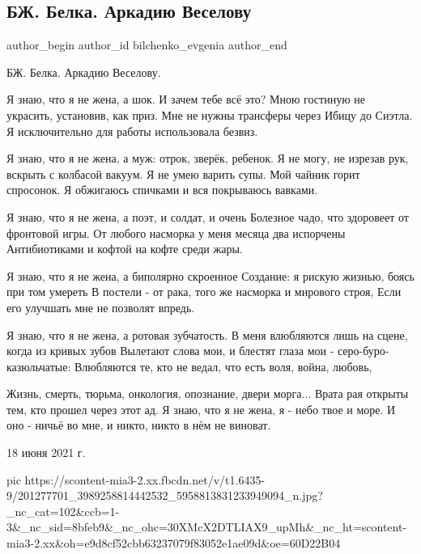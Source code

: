  
 
 
 
 
 
\subsection{БЖ. Белка. Аркадию Веселову}
\label{sec:18_06_2021.fb.bilchenko_evgenia.1.belka_arkadiju_veselovu}
\ifcmt
 author_begin
   author_id bilchenko_evgenia
 author_end
\fi

БЖ. Белка.
Аркадию Веселову.

Я знаю, что я не жена, а шок. И зачем тебе всё это?
Мною гостиную не украсить, установив, как приз.
Мне не нужны трансферы через Ибицу до Сиэтла.
Я исключительно для работы использовала безвиз.

Я знаю, что я не жена, а муж: отрок, зверёк, ребенок.
Я не могу, не изрезав рук, вскрыть с колбасой вакуум.
Я не умею варить супы. Мой чайник горит спросонок.
Я обжигаюсь спичками и вся покрываюсь вавками.

Я знаю, что я не жена, а поэт, и солдат, и очень
Болезное чадо, что здоровеет от фронтовой игры.
От любого насморка у меня месяца два испорчены
Антибиотиками и кофтой на кофте среди жары.

Я знаю, что я не жена, а биполярно скроенное
Создание: я рискую жизнью, боясь при том умереть
В постели - от рака, того же насморка и мирового строя,
Если его улучшать мне не позволят впредь.

Я знаю, что я не жена, а ротовая зубчатость.
В меня влюбляются лишь на сцене, когда из кривых зубов
Вылетают слова мои, и блестят глаза мои - серо-буро-казюльчатые:
Влюбляются те, кто не ведал, что есть воля, война, любовь,

Жизнь, смерть, тюрьма, онкология, опознание, двери  морга...
Врата рая открыты тем, кто прошел через этот ад.
Я знаю, что я не жена, я - небо твое и море.
И оно - ничьё во мне, и никто, никто в нём не виноват. 

18 июня 2021 г.

\ifcmt
  pic https://scontent-mia3-2.xx.fbcdn.net/v/t1.6435-9/201277701_3989258814442532_5958813831233949094_n.jpg?_nc_cat=102&ccb=1-3&_nc_sid=8bfeb9&_nc_ohc=30XMcX2DTLIAX9_upMh&_nc_ht=scontent-mia3-2.xx&oh=e9d8cf52cbb63237079f83052e1ae09d&oe=60D22B04
\fi

